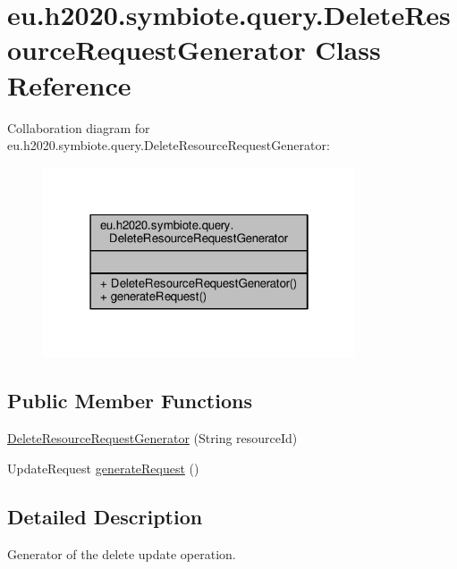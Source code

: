 \hypertarget{classeu_1_1h2020_1_1symbiote_1_1query_1_1DeleteResourceRequestGenerator}{}\section{eu.\+h2020.\+symbiote.\+query.\+Delete\+Resource\+Request\+Generator Class Reference}
\label{classeu_1_1h2020_1_1symbiote_1_1query_1_1DeleteResourceRequestGenerator}


Collaboration diagram for eu.\+h2020.\+symbiote.\+query.\+Delete\+Resource\+Request\+Generator\+:
\nopagebreak
\begin{figure}[H]
\begin{center}
\leavevmode
\includegraphics[width=262pt]{classeu_1_1h2020_1_1symbiote_1_1query_1_1DeleteResourceRequestGenerator__coll__graph}
\end{center}
\end{figure}
\subsection*{Public Member Functions}
\begin{DoxyCompactItemize}
\item 
\hyperlink{classeu_1_1h2020_1_1symbiote_1_1query_1_1DeleteResourceRequestGenerator_a60a58d7977ec74141daa2659d56e3166}{Delete\+Resource\+Request\+Generator} (String resource\+Id)
\item 
Update\+Request \hyperlink{classeu_1_1h2020_1_1symbiote_1_1query_1_1DeleteResourceRequestGenerator_a5da00db30549def4d9e17b51011d76b2}{generate\+Request} ()
\end{DoxyCompactItemize}


\subsection{Detailed Description}
Generator of the delete update operation.


